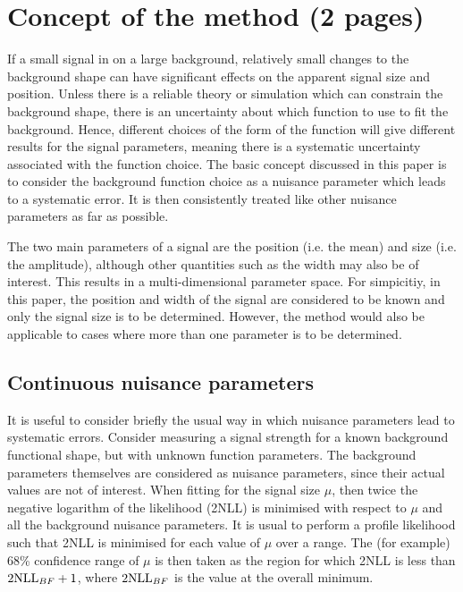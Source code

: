\section{Concept of the method (2 pages)}
\label{sec:concept}

If a small signal in on
a large background, relatively small changes to the background shape can
have significant effects on the apparent signal size and position.
Unless there is a
reliable theory or simulation which can constrain the background shape,
there is an uncertainty about which function to use to fit
the background. Hence, different choices of the form of the function
will give different results for the signal parameters, meaning there is a
systematic uncertainty associated with the function choice.
The basic concept discussed in this paper is to consider the background
function choice as a nuisance parameter which leads to a systematic error.
It is then consistently treated like other nuisance parameters as far as
possible.

The two main parameters of a signal are the position (i.e. the mean)
and size (i.e. the amplitude), although other
quantities such as the width may also be of interest. This results in a
multi-dimensional parameter space. For simpicitiy, in this paper, the position
and width of the signal are considered to be known and only the signal
size is to be determined. However, the method would also be applicable to
cases where more than one parameter is to be determined.

\subsection{Continuous nuisance parameters}
\label{sec:concept:continuous}

It is useful to consider briefly the usual way in which nuisance 
parameters lead to systematic errors. Consider measuring a signal
strength for a known background functional shape, but with unknown function
parameters. The background parameters themselves are considered as
nuisance parameters, since their actual values are not of interest.
When fitting for the signal size $\mu$, then twice the negative logarithm of the
likelihood (2NLL) is minimised with respect to $\mu$ and all the background
nuisance parameters. It is usual to perform a profile likelihood
such that 2NLL is minimised for each value of $\mu$ over a range. 
The (for example) 68\% confidence range of $\mu$ 
is then
taken as the region for which 2NLL is less than ${\rm 2NLL}_{BF}+1$,
where ${\rm 2NLL}_{BF}$ is the value at the overall minimum.


